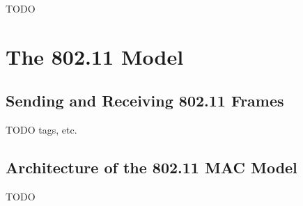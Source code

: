 \ifdraft TODO

\chapter{The 802.11 Model}
\label{cha:80211}


\section{Sending and Receiving 802.11 Frames}

TODO tags, etc.

\section{Architecture of the 802.11 MAC Model}

TODO

\fi




